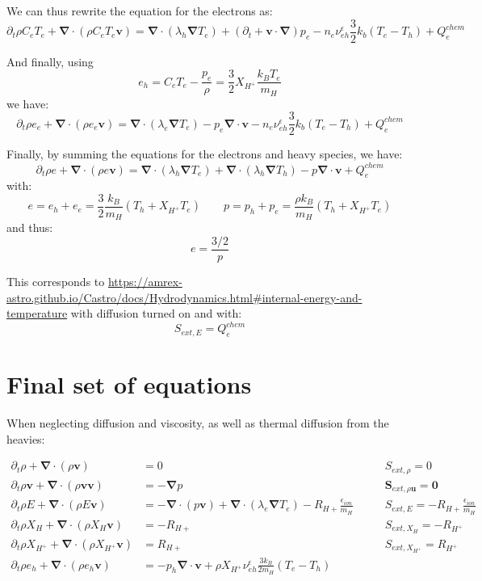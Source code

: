 \documentclass[11pt, oneside]{article}   	%
\begin{document}
We can thus rewrite the equation for the electrons as:
\[ \partial_t \rho C_e T_e + \boldsymbol{\nabla}\cdot(\rho C_e T_e \boldsymbol{v}) = \boldsymbol{\nabla}\cdot(\lambda_h\boldsymbol{\nabla}T_e) + (\partial_t + \boldsymbol{v}\cdot\boldsymbol{\nabla})p_e - n_e\nu_{eh}^\epsilon \frac{3}{2}k_b(T_e - T_h) + Q_e^{chem} \]

And finally, using
\[ e_h = C_e T_e - \frac{p_e}{\rho} = \frac{3}{2}X_{H^+}\frac{k_B T_e}{m_H} \]
we have:
\[ \partial_t \rho e_e + \boldsymbol{\nabla}\cdot(\rho e_e \boldsymbol{v}) = \boldsymbol{\nabla}\cdot(\lambda_e\boldsymbol{\nabla}T_e) - p_e\boldsymbol{\nabla}\cdot\boldsymbol{v} - n_e\nu_{eh}^\epsilon \frac{3}{2}k_b(T_e - T_h) + Q_e^{chem} \]

Finally, by summing the equations for the electrons and heavy species, we have:
\begin{equation}
\partial_t \rho e + \boldsymbol{\nabla}\cdot(\rho e \boldsymbol{v}) = \boldsymbol{\nabla}\cdot(\lambda_h\boldsymbol{\nabla}T_e) + \boldsymbol{\nabla}\cdot(\lambda_h\boldsymbol{\nabla}T_h) - p\boldsymbol{\nabla}\cdot\boldsymbol{v} + Q_e^{chem} \label{eq:internal_energy}
\end{equation}
with:
\[ e = e_h + e_e =  \frac{3}{2}\frac{k_B}{m_H}(T_h + X_{H^+}T_e) \qquad p = p_h + p_e = \frac{\rho k_B}{m_H}(T_h + X_{H^+}T_e) \]
and thus:
\[ e = \frac{3/2} p \]

This corresponds to \url{https://amrex-astro.github.io/Castro/docs/Hydrodynamics.html#internal-energy-and-temperature} with diffusion turned on and with:
\[ S_{ext, E} = Q_e^{chem} \]

\section{Final set of equations}

When neglecting diffusion and viscosity, as well as thermal diffusion from the heavies:

\begin{align}
\partial_t \rho + \boldsymbol{\nabla}\cdot( \rho\boldsymbol{v} ) &= 0 &\qquad S_{ext,\rho} = 0 \\
\partial_t \rho \boldsymbol{v} + \boldsymbol{\nabla}\cdot(\rho \boldsymbol{v} \boldsymbol{v}) &= -\boldsymbol{\nabla}p &\qquad \boldsymbol{S}_{ext,\rho\boldsymbol{u}} = \boldsymbol{0} \\
 \partial_t \rho E + \boldsymbol{\nabla}\cdot(\rho E \boldsymbol{v}) &= - \boldsymbol{\nabla}\cdot (p\boldsymbol{v}) + \boldsymbol{\nabla}\cdot(\lambda_e\boldsymbol{\nabla}T_e) -R_{H+} \frac{\epsilon_{ion}}{m_H}& \qquad S_{ext, E} = -R_{H+} \frac{\epsilon_{ion}}{m_H} \\
 \partial_t \rho X_H + \boldsymbol{\nabla}\cdot( \rho X_H \boldsymbol{v} ) &= -R_{H+} & \qquad S_{ext, X_H} = - R_{H^+}\\
 \partial_t \rho X_{H^+} + \boldsymbol{\nabla}\cdot( \rho X_{H^+} \boldsymbol{v} ) &= R_{H+} & \qquad S_{ext, X_{H^+}} = R_{H^+}\\
  \partial_t \rho e_h + \boldsymbol{\nabla}\cdot(\rho e_h \boldsymbol{v}) &= - p_h \boldsymbol{\nabla}\cdot \boldsymbol{v} + \rho X_{H^+}\nu_{eh}^\epsilon \frac{3 k_B}{2 m_H}(T_e - T_h) \label{eq:eh}
\end{align}
\end{document}
